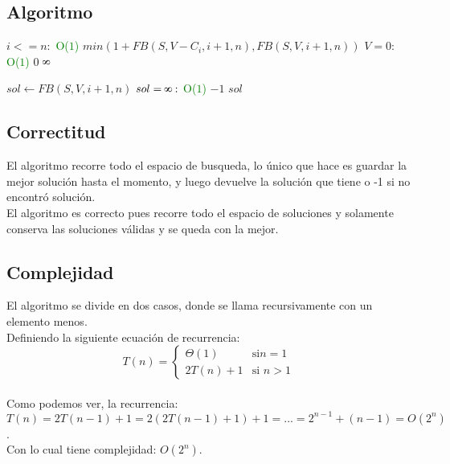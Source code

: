\subsection{Algoritmo}


\begin{codebox}
    \li \If $i <= n:$ \quad\quad\textcolor{green}{O($1$)}
        \Then
    \li   
            \Return $min(1+FB(S,V-C_{i},i+1,n),FB(S,V,i+1,n))$
        \End
    \li \If $V = 0:$ \quad\quad\textcolor{green}{O($1$)}
        \Then
    \li        
            \Return $0$
        \End
    \li     \Return $\infinity$

    \end{codebox}

\begin{codebox}
    \li $sol \leftarrow FB(S,V,i+1,n)$
    \li \If $sol = \infinity:$ \quad\quad\textcolor{green}{O($1$)}
        \Then
    \li   
            \Return $-1$
        \End
    \li     \Return $sol$

    \end{codebox}    
\subsection{Correctitud}
El algoritmo recorre todo el espacio de busqueda, lo \'unico que hace es guardar la mejor soluci\'on hasta el momento, y luego devuelve la soluci\'on que tiene o -1 si no encontr\'o soluci\'on.\\
El algoritmo es correcto pues recorre todo el espacio de soluciones y solamente conserva las soluciones v\'alidas y se queda con la mejor.
\subsection{Complejidad}
El algoritmo se divide en dos casos, donde se llama recursivamente con un elemento menos.\\
Definiendo la siguiente ecuaci\'on de recurrencia:\\
$$
T(n) = \left\{
\begin{array}{cl}
 \Theta (1) &\mbox{si
} n = 1 \\
2T(n)+1&\mbox{si } n > 1
\end{array}\right.
$$
\\
Como podemos ver, la recurrencia:\\ $T(n)= 2T(n-1) + 1 = 2(2T(n-1)+1)+1= ...= 2^{n-1}+ (n-1) = O(2^{n})$.\\
Con lo cual tiene complejidad: $O(2^{n})$.\\